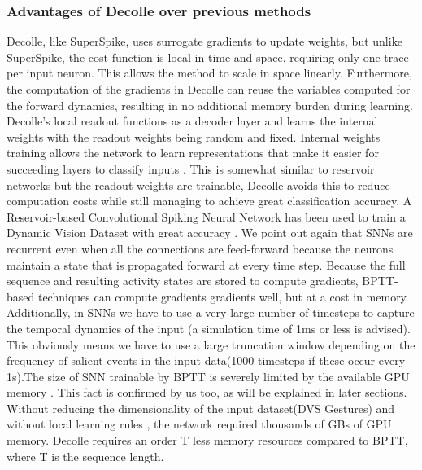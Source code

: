 \documentclass[12pt]{report}
\begin{document}
\subsubsection{Advantages of Decolle over previous methods}
Decolle, like SuperSpike, uses surrogate gradients to update weights, but unlike SuperSpike, the cost function is local in time and space, requiring only one trace per input neuron. This allows the method to scale in space linearly. Furthermore, the computation of the gradients in Decolle can reuse the variables computed for the forward dynamics, resulting in no additional memory burden during learning. Decolle's local readout functions as a decoder layer and learns the internal weights with the readout weights being random and fixed. Internal weights training allows the network to learn representations that make it easier for succeeding layers to classify inputs \cite{neftci2017} . This is somewhat similar to reservoir networks but the readout weights are trainable, Decolle avoids this to reduce computation costs while still managing to achieve great classification accuracy. A Reservoir-based Convolutional Spiking Neural Network has been used to train a Dynamic Vision Dataset with great accuracy \cite{george2020}. We point out again  that SNNs are recurrent even when all the connections are feed-forward because the neurons maintain a state that is propagated forward at every time step. Because the full sequence and resulting activity states are stored to compute gradients, BPTT-based techniques can compute gradients gradients well, but at a cost in memory. Additionally, in SNNs we have to use a very large number of timesteps to capture the temporal dynamics of the input (a simulation time of 1ms or less is advised). This obviously means we have to use a large truncation window depending on the frequency of salient events in the input data(1000 timesteps if these occur every 1s).The size of SNN trainable by BPTT is severely limited by the available GPU memory  \cite{ochard2018} . This fact is confirmed by us too, as will be explained in later sections. Without reducing the dimensionality of the input dataset(DVS Gestures) and without local learning rules , the network required thousands of GBs of GPU memory.  Decolle requires an order T less memory resources compared to BPTT, where T is the sequence length.
\end{document}
